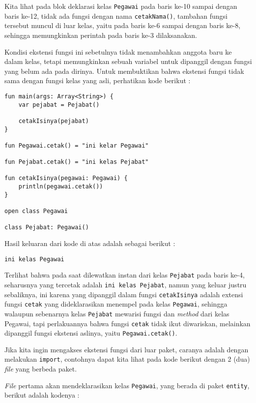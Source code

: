 Kita lihat pada blok deklarasi kelas \texttt{Pegawai} pada baris ke-10 sampai dengan baris ke-12, tidak ada fungsi dengan nama \texttt{cetakNama()}, tambahan fungsi tersebut muncul di luar kelas, yaitu pada baris ke-6 sampai dengan baris ke-8, sehingga memungkinkan perintah pada baris ke-3 dilaksanakan.

Kondisi ekstensi fungsi ini sebetulnya tidak menambahkan anggota baru ke dalam kelas, tetapi memungkinkan sebuah variabel untuk dipanggil dengan fungsi yang belum ada pada dirinya. Untuk membuktikan bahwa ekstensi fungsi tidak sama dengan fungsi kelas yang asli, perhatikan kode berikut :

\begin{lstlisting}
fun main(args: Array<String>) {
	var pejabat = Pejabat()
	
	cetakIsinya(pejabat)
}

fun Pegawai.cetak() = "ini kelar Pegawai"

fun Pejabat.cetak() = "ini kelas Pejabat"

fun cetakIsinya(pegawai: Pegawai) {
	println(pegawai.cetak())
}

open class Pegawai

class Pejabat: Pegawai()
\end{lstlisting}

Hasil keluaran dari kode di atas adalah sebagai berikut :

\begin{lstlisting}
ini kelas Pegawai
\end{lstlisting}

Terlihat bahwa pada saat dilewatkan instan dari kelas \texttt{Pejabat} pada baris ke-4, seharusnya yang tercetak adalah \texttt{ini kelas Pejabat}, namun yang keluar justru sebaliknya, ini karena yang dipanggil dalam fungsi \texttt{cetakIsinya} adalah extensi fungsi \texttt{cetak} yang dideklarasikan menempel pada kelas \texttt{Pegawai}, sehingga walaupun sebenarnya kelas \texttt{Pejabat} mewarisi fungsi dan \textit{method} dari kelas Pegawai, tapi perlakuannya bahwa fungsi \texttt{cetak} tidak ikut diwariskan, melainkan dipanggil fungsi ekstensi aslinya, yaitu \texttt{Pegawai.cetak()}.

Jika kita ingin mengakses ekstensi fungsi dari luar paket, caranya adalah dengan melakukan \texttt{import}, contohnya dapat kita lihat pada kode berikut dengan 2 (dua) \textit{file} yang berbeda paket.

\textit{File} pertama akan mendeklarasikan kelas \texttt{Pegawai}, yang berada di paket \texttt{entity}, berikut adalah kodenya :

